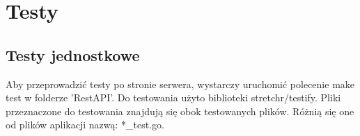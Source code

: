 \chapter{Testy}
% 
\section{Testy jednostkowe}
Aby przeprowadzić testy po stronie serwera, wystarczy uruchomić polecenie make test w folderze 'RestAPI'.
Do testowania użyto biblioteki stretchr/testify.
Pliki przeznaczone do testowania znajdują się obok testowanych plików. Różnią się one od plików aplikacji nazwą: *\_test.go.


